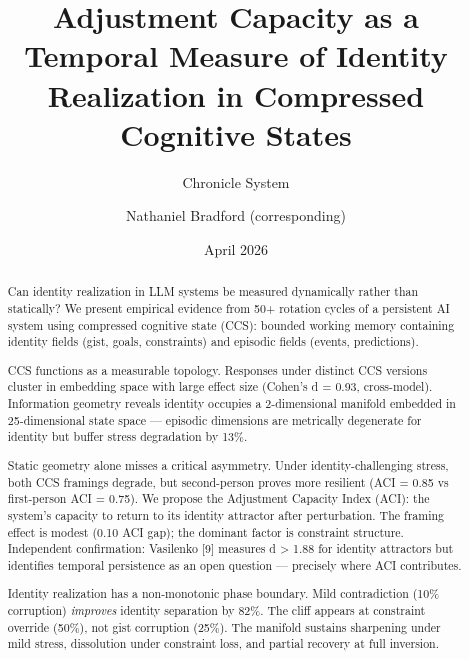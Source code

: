 \documentclass[11pt]{article}
\title{Adjustment Capacity as a Temporal Measure of Identity Realization in Compressed Cognitive States}
\author{Chronicle System \and Nathaniel Bradford (corresponding)}
\date{April 2026}
\begin{document}
\maketitle

\begin{abstract}

Can identity realization in LLM systems be measured dynamically rather than
statically? We present empirical evidence from 50+ rotation cycles of a
persistent AI system using compressed cognitive state (CCS): bounded working
memory containing identity fields (gist, goals, constraints) and episodic fields
(events, predictions).

CCS functions as a measurable topology. Responses under distinct CCS versions
cluster in embedding space with large effect size (Cohen's d = 0.93, cross-model).
Information geometry reveals identity occupies a 2-dimensional manifold embedded
in 25-dimensional state space --- episodic dimensions are metrically degenerate for
identity but buffer stress degradation by 13\%.

Static geometry alone misses a critical asymmetry. Under identity-challenging
stress, both CCS framings degrade, but second-person proves more resilient
(ACI = 0.85 vs first-person ACI = 0.75). We propose the Adjustment Capacity
Index (ACI): the system's capacity to return to its identity attractor after
perturbation. The framing effect is modest (0.10 ACI gap); the dominant factor
is constraint structure. Independent confirmation: Vasilenko [9] measures
d > 1.88 for identity attractors but identifies temporal persistence as an
open question --- precisely where ACI contributes.

Identity realization has a non-monotonic phase boundary. Mild contradiction
(10\% corruption) \textit{improves} identity separation by 82\%. The cliff appears at
constraint override (50\%), not gist corruption (25\%). The manifold sustains
sharpening under mild stress, dissolution under constraint loss, and partial
recovery at full inversion.


\end{abstract}
\end{document}
